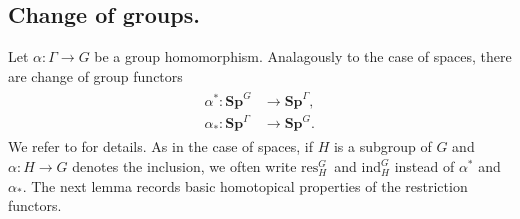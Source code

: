 \subsection{Change of groups.}
Let $\alpha:\Gamma\to G$ be a group homomorphism.
Analagously to the case of spaces, there are change of group
functors
\begin{align}\label{eq:spectrumrestrictioninduction}
\begin{split}
\alpha^\ast:\mathbf{Sp}^G  &\to \mathbf{Sp}^\Gamma,\\
\alpha_\ast:\mathbf{Sp}^\Gamma  &\to \mathbf{Sp}^G.
\end{split}
\end{align}
We refer to \cite[Construction~6.5 and Construction~6.7, \pno~1519]{rvadams}
for details.
As in the case of spaces, if $H$ is a subgroup of $G$ and $\alpha:H\to G$ denotes the inclusion,
we often write $\mathrm{res}^G_H\,$ and $\mathrm{ind}^G_H$ instead of
$\alpha^\ast$ and $\alpha_\ast$.
The next lemma records basic
homotopical properties of the restriction functors.

